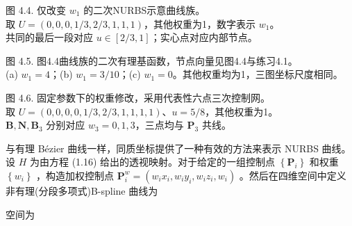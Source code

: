 \documentclass[../main.tex]{subfiles}
\begin{document}
\begin{center}
\begin{minipage}{18cm}
\vspace*{.6\baselineskip}
\centering
{}
\par\smallskip
图 4.4. 仅改变 \(w_1\) 的二次NURBS示意曲线族。\\ 取 \(U=(0,0,0,1/3,2/3,1,1,1)\)，其他权重为1，数字表示 \(w_1\)。\\ 共同的最后一段对应 \(u\in[2/3,1]\)；实心点对应内部节点。
\end{minipage}
\end{center}

\begin{center}
\begin{minipage}{18cm}
\vspace*{.6\baselineskip}
\centering
{}
\par\smallskip
图 4.5. 图4.4曲线族的二次有理基函数，节点向量见图4.4与练习4.1。\\ (a) \(w_1=4\)；(b) \(w_1=3/10\)；(c) \(w_1=0\)。其他权重均为1，三图坐标尺度相同。
\end{minipage}
\end{center}

\begin{center}
\begin{minipage}{18cm}
\vspace*{.6\baselineskip}
\centering
{}
\par\smallskip
图 4.6. 固定参数下的权重修改，采用代表性六点三次控制网。\\ 取 \(U=(0,0,0,0,1/3,2/3,1,1,1,1)\)、\(u=5/8\)，其他权重为1。\\ \(\mathbf B,\mathbf N,\mathbf B_3\) 分别对应 \(w_3=0,1,3\)，三点均与 \(\mathbf P_3\) 共线。
\end{minipage}
\end{center}

与有理 Bézier 曲线一样，同质坐标提供了一种有效的方法来表示 NURBS 曲线。设 \(H\) 为由方程 (1.16) 给出的透视映射。对于给定的一组控制点 \(\left\{  {\mathbf{P}}_{i}\right\}\) 和权重 \(\left\{  {w}_{i}\right\}\) ，构造加权控制点 \({\mathbf{P}}_{i}^{w} = \left( {{w}_{i}{x}_{i},{w}_{i}{y}_{i},{w}_{i}{z}_{i},{w}_{i}}\right)\) 。然后在四维空间中定义非有理(分段多项式)B-spline 曲线为

空间为
\end{document}
